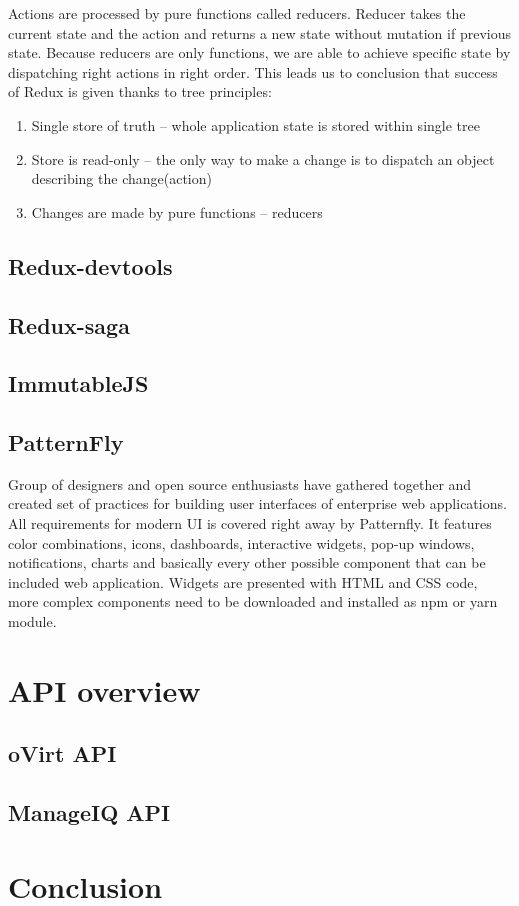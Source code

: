 Actions are processed by pure functions called reducers. Reducer takes the current state and the action and returns a new state without mutation if previous state. Because reducers are only functions, we are able to achieve specific state by dispatching right actions in right order. This leads us to conclusion that success of Redux is given thanks to tree principles:
\begin{enumerate}
\item Single store of truth -- whole application state is stored within single tree
\item Store is read-only -- the only way to make a change is to dispatch an object describing the change(action)
\item Changes are made by pure functions -- reducers 
\end{enumerate}


\section{Redux-devtools}
\section{Redux-saga}
\section{ImmutableJS}
\section{PatternFly}
Group of designers and open source enthusiasts have gathered together and created set of practices for building user interfaces of enterprise web applications. All requirements for modern UI is covered right away by Patternfly. It features color combinations, icons, dashboards, interactive widgets, pop-up windows, notifications, charts and basically every other possible component that can be included web application. Widgets are presented with HTML and CSS code, more complex components need to be downloaded and installed as npm or yarn module.

\chapter{API overview}

\section{oVirt API}
\section{ManageIQ API}







\chapter{Conclusion}

